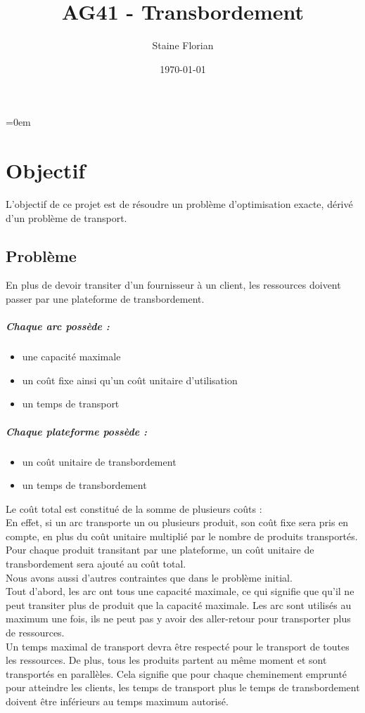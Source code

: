 \documentclass[a4paper, 12pt]{report}
\title{AG41 - Transbordement}
\author{Staine Florian}
\date\today
\begin{document}
\maketitle
\parindent=0em

\chapter{Objectif}
L'objectif de ce projet est de résoudre un problème d'optimisation exacte, 
dérivé d'un problème de transport. 
\section{Problème}
En plus de devoir transiter d'un fournisseur à un client, 
les ressources doivent passer par une plateforme de transbordement.

\paragraph{Chaque arc possède : }
\begin{itemize}
 \item une capacité maximale
 \item un coût fixe ainsi qu'un coût unitaire d'utilisation
 \item un temps de transport
\end{itemize}

\paragraph{Chaque plateforme possède : }
\begin{itemize}
 \item un coût unitaire de transbordement
 \item un temps de transbordement\newline
\end{itemize}

Le coût total est constitué de la somme de plusieurs coûts :\\
En effet, si un arc transporte un ou plusieurs produit, son coût fixe sera pris en compte, 
en plus du coût unitaire multiplié par le nombre de produits transportés.
Pour chaque produit transitant par une plateforme, un coût unitaire de transbordement sera ajouté au coût total.\\

Nous avons aussi d'autres contraintes que dans le problème initial.\\
Tout d'abord, les arc ont tous une capacité maximale, ce qui signifie que 
qu'il ne peut transiter plus de produit que la capacité maximale. 
Les arc sont utilisés au maximum une fois, ils ne peut pas y avoir des aller-retour 
pour transporter plus de ressources.\\
Un temps maximal de transport devra être respecté pour le transport de toutes les ressources.
De plus, tous les produits partent au même moment et sont transportés en parallèles. 
Cela signifie que pour chaque cheminement emprunté pour atteindre les clients,
les temps de transport plus le temps de transbordement doivent être inférieurs au temps maximum autorisé.
\end{document}
